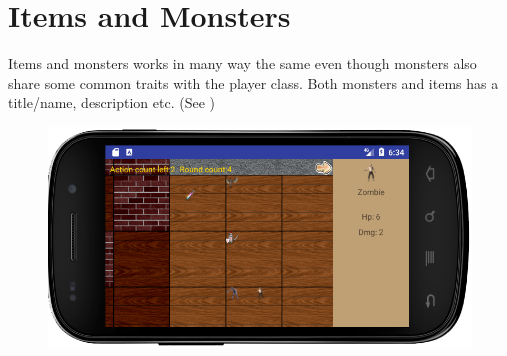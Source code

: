 \section{Items and Monsters}

Items and monsters works in many way the same even though monsters also share some common traits with the player class.
Both monsters and items has a title/name, description etc. (See )

\begin{figure}[ht!]
	\centering
	\includegraphics[width=130mm]{images/FrontpageImage.png}
\end{figure}